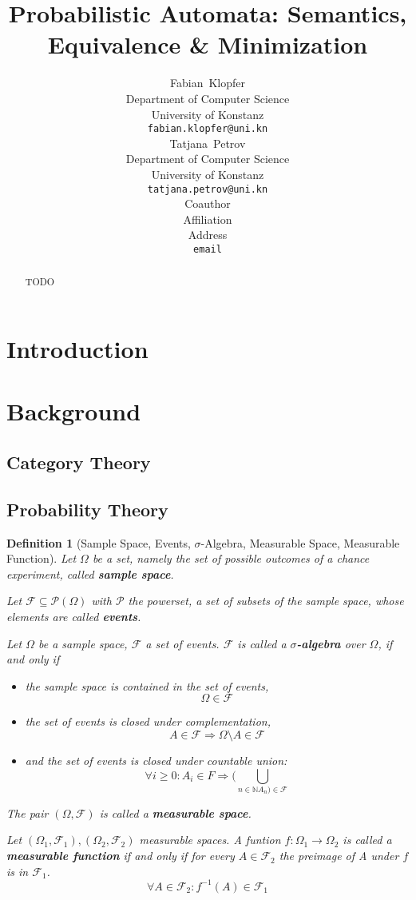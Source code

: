 \documentclass{article} %
\title{Probabilistic Automata: Semantics, Equivalence \& Minimization}
\author{
Fabian~Klopfer \\
Department of Computer Science\\
University of Konstanz\\
\texttt{fabian.klopfer@uni.kn} \\
\And
Tatjana~Petrov \\
Department of Computer Science \\
University of Konstanz \\
\texttt{tatjana.petrov@uni.kn} \\
\AND
Coauthor \\
Affiliation \\
Address \\
\texttt{email} \\
}
\newtheorem{definition}{Definition}[section]
\begin{document}
\maketitle

\begin{abstract}
TODO
\end{abstract}

\section{Introduction}\label{intro}



\section{Background}\label{bg}
    \subsection{Category Theory}
        
        
    \subsection{Probability Theory}
        \begin{definition}[Sample Space, Events, $\sigma$-Algebra, Measurable Space, Measurable Function]
            Let $\Omega$ be a set, namely the set of possible outcomes of a chance experiment, called \textbf{sample space}.
            
            Let $\mathcal{F} \subseteq \mathcal{P}(\Omega)$ with $\mathcal{P}$ the powerset, a set of subsets of the sample space, whose elements are called \textbf{events}.
            
            Let $\Omega$ be a sample space, $\mathcal{F}$ a set of events.
            $\mathcal{F}$ is called a \textbf{$\sigma$-algebra} over $\Omega$, if and only if
            \begin{itemize}
            \item the sample space is contained in the set of events,
            \[ \Omega \in \mathcal{F} \]
            \item the set of events is closed under complementation,
            \[ A \in \mathcal{F} \Rightarrow \Omega \setminus A \in \mathcal F \]
            \item and the set of events is closed under countable union:
            \[ \forall i \geq 0: A_i \in F \Rightarrow (\bigcup_{n \in \mathbb{N} A_n) \in \mathcal{F}} \]
            \end{itemize}
            
            The pair $\left( \Omega, \mathcal{F} \right)$ is called a \textbf{measurable space}.

            Let $\left( \Omega_1, \mathcal{F}_1 \right), \left( \Omega_2, \mathcal{F}_2 \right)$ measurable spaces. A funtion $f: \Omega_1 \rightarrow \Omega_2$ is called a \textbf{measurable function} if and only if for every $A \in \mathcal{F}_2$ the preimage of A under $f$ is in $\mathcal{F}_1$.
            \[ \forall A \in \mathcal{F}_2: f^{-1}(A) \in \mathcal{F}_1 \]
        \end{definition}
            
\end{document}
